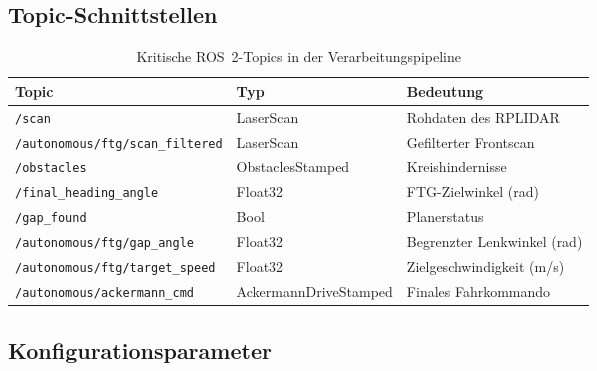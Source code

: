\subsection{Topic-Schnittstellen}

\begin{table}[H]
\centering
\caption{Kritische ROS~2-Topics in der Verarbeitungspipeline}
\label{tab:topics}
\begin{tabularx}{\textwidth}{llX}
\toprule
\textbf{Topic} & \textbf{Typ} & \textbf{Bedeutung} \\
\midrule
\texttt{/scan}                         & LaserScan       & Rohdaten des RPLIDAR \\
\texttt{/autonomous/ftg/scan\_filtered} & LaserScan       & Gefilterter Frontscan \\
\texttt{/obstacles}                    & ObstaclesStamped & Kreishindernisse \\
\texttt{/final\_heading\_angle}         & Float32         & FTG-Zielwinkel (rad) \\
\texttt{/gap\_found}                   & Bool            & Planerstatus \\
\texttt{/autonomous/ftg/gap\_angle}     & Float32         & Begrenzter Lenkwinkel (rad) \\
\texttt{/autonomous/ftg/target\_speed}  & Float32         & Zielgeschwindigkeit (m/s) \\
\texttt{/autonomous/ackermann\_cmd}     & AckermannDriveStamped & Finales Fahrkommando \\
\bottomrule
\end{tabularx}
\end{table}

\subsection{Konfigurationsparameter}

